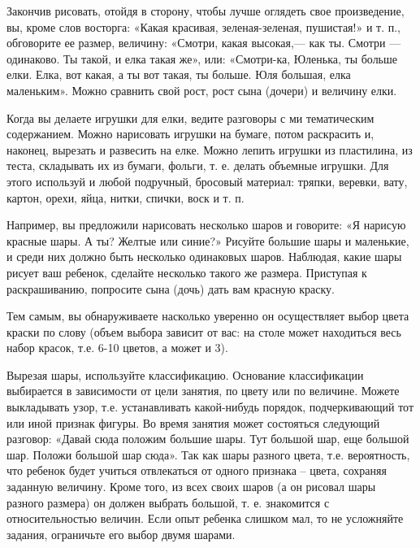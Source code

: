 \documentclass[a5paper]{book}
\begin{document}
Закончив рисовать, отойдя в сторону, чтобы лучше оглядеть свое
произведение, вы, кроме слов восторга: «Какая красивая, зеленая-зеленая,
пушистая!» и т. п., обговорите ее размер, величину: «Смотри, какая
высокая,--- как ты. Смотри --- одинаково. Ты такой, и елка такая же»,
или: «Смотри-ка, Юленька, ты больше елки. Елка, вот какая, а ты вот
такая, ты больше. Юля большая, елка маленьким». Можно сравнить свой
рост, рост сына (дочери) и величину елки.

Когда вы делаете игрушки для елки, ведите разговоры с ми тематическим
содержанием. Можно нарисовать игрушки на бумаге, потом раскрасить и,
наконец, вырезать и развесить на елке. Можно лепить игрушки из
пластилина, из теста, складывать их из бумаги, фольги, т. е. делать
объемные игрушки. Для этого используй и любой подручный, бросовый
материал: тряпки, веревки, вату, картон, орехи, яйца, нитки, спички,
воск и т. п.

Например, вы предложили нарисовать несколько шаров и говорите: «Я
нарисую красные шары. А ты? Желтые или синие?» Рисуйте большие шары и
маленькие, и среди них должно быть несколько одинаковых шаров. Наблюдая,
какие шары рисует ваш ребенок, сделайте несколько такого же размера.
Приступая к раскрашиванию, попросите сына (дочь) дать вам красную
краску.

Тем самым, вы обнаруживаете насколько уверенно он осуществляет выбор
цвета краски по слову (объем выбора зависит от вас: на столе может
находиться весь набор красок, т.е. 6-10 цветов, а может и 3).

Вырезая шары, используйте классификацию. Основание классификации
выбирается в зависимости от цели занятия, по цвету или по величине.
Можете выкладывать узор, т.е. устанавливать какой-нибудь порядок,
подчеркивающий тот или иной признак фигуры. Во время занятия может
состояться следующий разговор: «Давай сюда положим большие шары. Тут
большой шар, еще большой шар. Положи большой шар сюда». Так как шары
разного цвета, т.е. вероятность, что ребенок будет учиться отвлекаться
от одного признака -- цвета, сохраняя заданную величину. Кроме того, из
всех своих шаров (а он рисовал шары разного размера) он должен выбрать
большой, т. е. знакомится с относительностью величин. Если опыт ребенка
слишком мал, то не усложняйте задания, ограничьте его выбор двумя
шарами.
\end{document}
